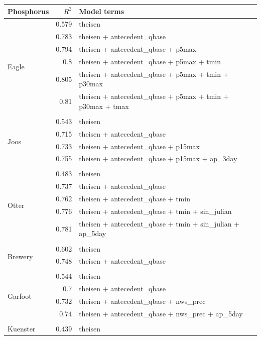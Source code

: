 \documentclass[10pt]{article}
\begin{document}
\begin{table}[h] \small
    \begin{center}
    \begin{tabular}{lrl}
    \textbf{Phosphorus} & $R^2$ & Model terms \\
    \hline
\multirow{7}{*}{Eagle} & 0.579 & theisen\\ 
 & 0.783 & theisen + antecedent\_qbase\\ 
 & 0.794 & theisen + antecedent\_qbase + p5max\\ 
 & 0.8 & theisen + antecedent\_qbase + p5max + tmin\\ 
 & 0.805 & theisen + antecedent\_qbase + p5max + tmin + p30max\\ 
 & 0.81 & theisen + antecedent\_qbase + p5max + tmin + p30max + tmax\\ 
\vspace{2mm}\\ \multirow{5}{*}{Joos} & 0.543 & theisen\\ 
 & 0.715 & theisen + antecedent\_qbase\\ 
 & 0.733 & theisen + antecedent\_qbase + p15max\\ 
 & 0.755 & theisen + antecedent\_qbase + p15max + ap\_3day\\ 
\vspace{2mm}\\ \multirow{6}{*}{Otter} & 0.483 & theisen\\ 
 & 0.737 & theisen + antecedent\_qbase\\ 
 & 0.762 & theisen + antecedent\_qbase + tmin\\ 
 & 0.776 & theisen + antecedent\_qbase + tmin + sin\_julian\\ 
 & 0.781 & theisen + antecedent\_qbase + tmin + sin\_julian + ap\_5day\\ 
\vspace{2mm}\\ \multirow{3}{*}{Brewery} & 0.602 & theisen\\ 
 & 0.748 & theisen + antecedent\_qbase\\ 
\vspace{2mm}\\ \multirow{5}{*}{Garfoot} & 0.544 & theisen\\ 
 & 0.7 & theisen + antecedent\_qbase\\ 
 & 0.732 & theisen + antecedent\_qbase + nws\_prec\\ 
 & 0.74 & theisen + antecedent\_qbase + nws\_prec + ap\_5day\\ 
\vspace{2mm}\\ \multirow{5}{*}{Kuenster} & 0.439 & theisen\\ 

\end{tabular}
\end{center}
\end{table}
\end{document}
